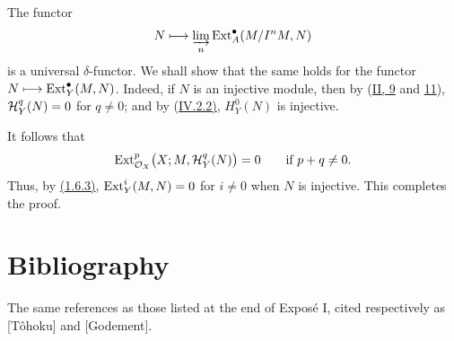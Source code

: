 The functor
\[
 N\longmapsto \varinjlim_n \operatorname{Ext}_A^{\bullet}(M/I^nM,N)
\]
is a universal $\delta$-functor. We shall show that the same holds for the
functor $N\longmapsto \operatorname{Ext}_Y^{\bullet}(M,N)$. Indeed, if $N$ is an injective
module, then by \textup{(\hyperref[II.9]{II, 9} and \hyperref[II.11]{11})}, $\mathcal H_Y^q(N)=0$ for $q\ne0$; and
by \textup{(\hyperref[IV.2.2]{IV.2.2)}}, $H_Y^0(N)$ is injective.

It follows that
\[
 \operatorname{Ext}_{\mathcal O_X}^{p}\bigl(X;M,\mathcal H_Y^q(N)\bigr)=0
 \qquad\text{if }p+q\ne0.
\]
Thus, by \hyperref[VI.1.6.3]{(1.6.3)}, $\operatorname{Ext}_Y^i(M,N)=0$ for $i\ne0$ when $N$ is injective. This
completes the proof.

\section*{Bibliography}
The same references as those listed at the end of Expos\'e I, cited
respectively as [T\^ohoku] and [Godement].
